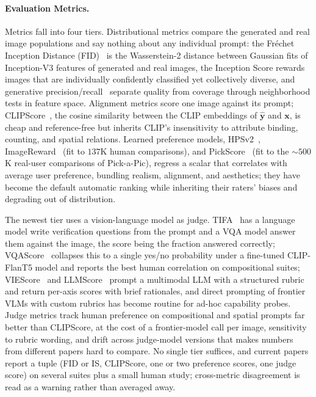 \paragraph{Evaluation Metrics.}
Metrics fall into four tiers.
Distributional metrics compare the generated and real image populations and say nothing about any individual prompt: the Fr\'echet Inception Distance (FID)~\cite{heusel2017gans} is the Wasserstein-2 distance between Gaussian fits of Inception-V3 features of generated and real images, the Inception Score rewards images that are individually confidently classified yet collectively diverse, and generative precision/recall~\cite{sajjadi2018assessing,kynkaanniemi2019improved} separate quality from coverage through neighborhood tests in feature space.
Alignment metrics score one image against its prompt; CLIPScore~\cite{hessel2021clipscore}, the cosine similarity between the CLIP embeddings of $\hat{\mathbf{y}}$ and $\mathbf{x}$, is cheap and reference-free but inherits CLIP's insensitivity to attribute binding, counting, and spatial relations.
Learned preference models, HPSv2~\cite{wu2023hpsv2}, ImageReward~\cite{xu2023imagereward} (fit to $137$K human comparisons), and PickScore~\cite{kirstain2023pickapic} (fit to the ${\sim}500$K real-user comparisons of Pick-a-Pic), regress a scalar that correlates with average user preference, bundling realism, alignment, and aesthetics; they have become the default automatic ranking while inheriting their raters' biases and degrading out of distribution.

The newest tier uses a vision-language model as judge.
TIFA~\cite{hu2023tifa} has a language model write verification questions from the prompt and a VQA model answer them against the image, the score being the fraction answered correctly; VQAScore~\cite{lin2024evaluating} collapses this to a single yes/no probability under a fine-tuned CLIP-FlanT5 model and reports the best human correlation on compositional suites; VIEScore~\cite{ku2023viescore} and LLMScore~\cite{lu2023llmscore} prompt a multimodal LLM with a structured rubric and return per-axis scores with brief rationales, and direct prompting of frontier VLMs with custom rubrics has become routine for ad-hoc capability probes.
Judge metrics track human preference on compositional and spatial prompts far better than CLIPScore, at the cost of a frontier-model call per image, sensitivity to rubric wording, and drift across judge-model versions that makes numbers from different papers hard to compare.
No single tier suffices, and current papers report a tuple (FID or IS, CLIPScore, one or two preference scores, one judge score) on several suites plus a small human study; cross-metric disagreement is read as a warning rather than averaged away.



